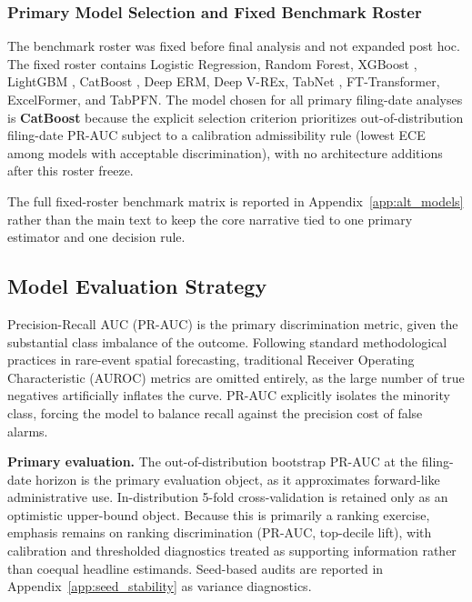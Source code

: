 \documentclass[11pt, letterpaper]{article}
\begin{document}
\subsubsection{Primary Model Selection and Fixed Benchmark Roster}
The benchmark roster was fixed before final analysis and not expanded post hoc. The fixed roster contains Logistic Regression, Random Forest, XGBoost \cite{chen2016xgboost}, LightGBM \cite{ke2017lightgbm}, CatBoost \cite{prokhorenkova2018catboost}, Deep ERM, Deep V-REx, TabNet \cite{arik2021tabnet}, FT-Transformer, ExcelFormer, and TabPFN. The model chosen for all primary filing-date analyses is \textbf{CatBoost} because the explicit selection criterion prioritizes out-of-distribution filing-date PR-AUC subject to a calibration admissibility rule (lowest ECE among models with acceptable discrimination), with no architecture additions after this roster freeze.

The full fixed-roster benchmark matrix is reported in Appendix~\ref{app:alt_models} rather than the main text to keep the core narrative tied to one primary estimator and one decision rule.



  \subsection{Model Evaluation Strategy}

Precision-Recall AUC (PR-AUC) is the primary discrimination metric, given the substantial class imbalance of the outcome. Following standard methodological practices in rare-event spatial forecasting, traditional Receiver Operating Characteristic (AUROC) metrics are omitted entirely, as the large number of true negatives artificially inflates the curve. PR-AUC explicitly isolates the minority class, forcing the model to balance recall against the precision cost of false alarms.

\textbf{Primary evaluation.} The out-of-distribution bootstrap PR-AUC at the filing-date horizon is the primary evaluation object, as it approximates forward-like administrative use. In-distribution 5-fold cross-validation is retained only as an optimistic upper-bound object. Because this is primarily a ranking exercise, emphasis remains on ranking discrimination (PR-AUC, top-decile lift), with calibration and thresholded diagnostics treated as supporting information rather than coequal headline estimands. Seed-based audits are reported in Appendix~\ref{app:seed_stability} as variance diagnostics.
\end{document}
